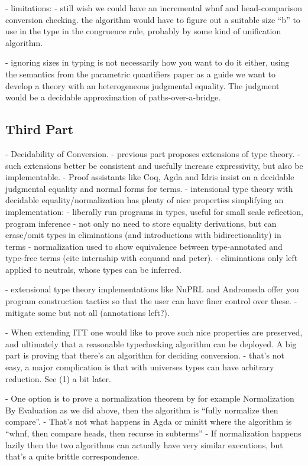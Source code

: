    - limitations:
     - still wish we could have an incremental whnf and
     head-comparison conversion checking. the algorithm would have to
     figure out a suitable size ``b'' to use in the type in the
     congruence rule, probably by some kind of unification algorithm.
     
     - ignoring sizes in typing is not necessarily how you want to do
     it either, using the semantics from the parametric quantifiers
     paper as a guide we want to develop a theory with an
     heterogeneous judgmental equality.
     The judgment would be a decidable approximation of
     paths-over-a-bridge.

\subsection{Third Part}
- Decidability of Conversion.
 - previous part proposes extensions of type theory.
 - such extensions better be consistent and usefully increase expressivity, but also be implementable.
 - Proof assistants like Coq, Agda and Idris insist on a decidable judgmental equality and normal forms for terms. 
 - intensional type theory with decidable equality/normalization has plenty of nice properties simplifying an implementation:
   - liberally run programs in types, useful for small scale reflection, program inference
   - not only no need to store equality derivations, but can erase/omit types in eliminations (and introductions with bidirectionality) in terms
      - normalization used to show equivalence between type-annotated and type-free terms (cite internship with coquand and peter).
         - eliminations only left applied to neutrals, whose types can be inferred.

   - extensional type theory implementations like NuPRL and Andromeda
   offer you program construction tactics so that the user can have finer control over these.
    - mitigate some but not all (annotations left?).

 - When extending ITT one would like to prove such nice properties are
 preserved, and ultimately that a reasonable typechecking algorithm
 can be deployed. A big part is proving that there's an algorithm for
 deciding conversion.
   - that's not easy, a major complication is that with universes types can have arbitrary reduction. See (1) a bit later.
 
 - One option is to prove a normalization theorem by for example
 Normalization By Evaluation as we did above, then the algorithm is ``fully normalize then compare''.
   - That's not what happens in Agda or minitt where the algorithm is ``whnf, then compare heads, then recurse in subterms''
   - If normalization happens lazily then the two algorithms can actually have very similar executions, but that's a quite brittle correspondence.
   

